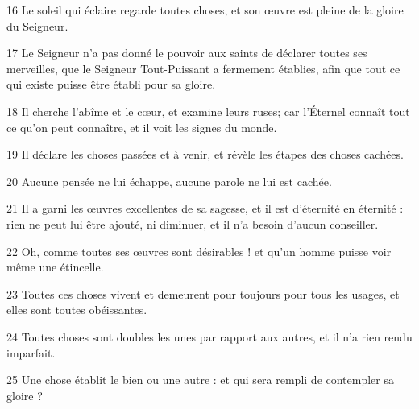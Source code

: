 \par 16 Le soleil qui éclaire regarde toutes choses, et son œuvre est pleine de la gloire du Seigneur.
\par 17 Le Seigneur n'a pas donné le pouvoir aux saints de déclarer toutes ses merveilles, que le Seigneur Tout-Puissant a fermement établies, afin que tout ce qui existe puisse être établi pour sa gloire.
\par 18 Il cherche l'abîme et le cœur, et examine leurs ruses; car l'Éternel connaît tout ce qu'on peut connaître, et il voit les signes du monde.
\par 19 Il déclare les choses passées et à venir, et révèle les étapes des choses cachées.
\par 20 Aucune pensée ne lui échappe, aucune parole ne lui est cachée.
\par 21 Il a garni les œuvres excellentes de sa sagesse, et il est d'éternité en éternité : rien ne peut lui être ajouté, ni diminuer, et il n'a besoin d'aucun conseiller.
\par 22 Oh, comme toutes ses œuvres sont désirables ! et qu'un homme puisse voir même une étincelle.
\par 23 Toutes ces choses vivent et demeurent pour toujours pour tous les usages, et elles sont toutes obéissantes.
\par 24 Toutes choses sont doubles les unes par rapport aux autres, et il n'a rien rendu imparfait.
\par 25 Une chose établit le bien ou une autre : et qui sera rempli de contempler sa gloire ?


